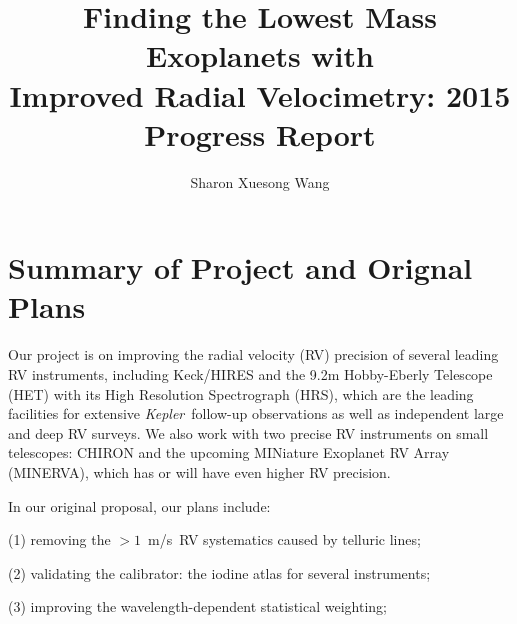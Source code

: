 \documentclass[12pt]{article}
\def\mps{m/s}
\def\kepler{{\it Kepler}}
\def\minerva{MINERVA}
\begin{document}

\title{\vspace{-45pt} \bf \Large Finding the Lowest Mass Exoplanets with
  \\ Improved Radial Velocimetry: 2015 Progress Report \vspace{-15pt}}
\author{\normalsize Sharon Xuesong Wang}
\date{}
\maketitle

\vspace{-40pt}
\section{Summary of Project and Orignal Plans}
\vspace{-5pt}

Our project is on improving the radial velocity (RV) precision of
several leading RV instruments, including Keck/HIRES and the 9.2m
Hobby-Eberly Telescope (HET) with its High Resolution Spectrograph
(HRS), which are the leading facilities for extensive
\kepler\ follow-up observations as well as independent large and deep
RV surveys. We also work with two precise RV instruments on small
telescopes: CHIRON and the upcoming MINiature Exoplanet RV Array
(\minerva), which has or will have even higher RV precision.

In our original proposal, our plans include:

(1) removing the $>1$~\mps\ RV systematics caused by telluric lines;

(2) validating the calibrator: the iodine atlas for several instruments;

(3) improving the wavelength-dependent statistical weighting;
\end{document}
